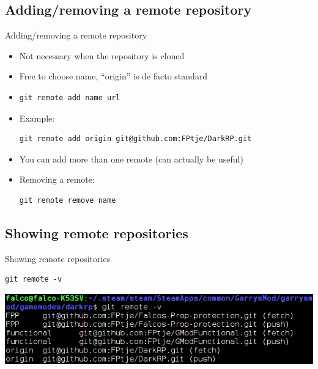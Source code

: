 \documentclass[10pt,a4paper]{beamer}
\begin{document}
\subsection{Adding/removing a remote repository}
\begin{frame}[fragile]{Adding/removing a remote repository}
\begin{itemize}
\item Not necessary when the repository is cloned
\item Free to choose name, ``origin'' is de facto standard
\item \begin{verbatim}git remote add name url\end{verbatim}
\item Example:
\begin{verbatim}git remote add origin git@github.com:FPtje/DarkRP.git\end{verbatim}
\item You can add more than one remote (can actually be useful)
\item Removing a remote:
\begin{verbatim}git remote remove name\end{verbatim}
\end{itemize}
\end{frame}

\subsection{Showing remote repositories}
\begin{frame}[fragile]{Showing remote repositories}
\begin{verbatim}git remote -v\end{verbatim}
\includegraphics[width=\linewidth]{gitremote.png}
\end{frame}
\end{document}
